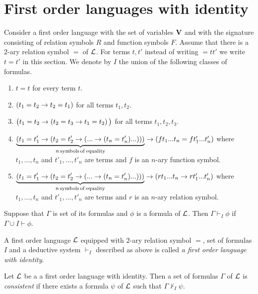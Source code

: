 \documentclass[10pt]{amsart}
\begin{document}
\section{First order languages with identity}
\noindent
Consider a first order language with the set of variables $\mathbf{V}$ and with the signature consisting of relation symbols $R$ and function symbols $F$. Assume that there is a $2$-ary relation symbol $=$ of ${\mathcal L}$. For terms $t,t'$ instead of writing $=tt'$ we write $t = t'$ in this section. We denote by $I$ the union of the following classes of formulas.
\begin{enumerate}[label=\textbf{(\arabic*)}, leftmargin=3.0em]
	\item $t = t$ for every term $t$.
	\item $(t_1 = t_2 \rightarrow t_2 = t_1)$ for all terms $t_1,t_2$.
	\item $\big(t_1 = t_2 \rightarrow \left(t_2 = t_3\rightarrow t_1 = t_2\right)\big)$ for all terms $t_1,t_2,t_3$.
	\item $\underbrace{\left(t_1 = t'_1 \rightarrow \left( t_2 = t'_2 \rightarrow \left(... \rightarrow (t_n = t'_n)...\right)\right)\right)}_{n\,\mathrm{symbols\,of\,equality}} \rightarrow \left(ft_1...t_n = ft'_1...t'_n\right)$ where $t_1,...,t_n$ and $t'_1,...,t'_n$ are terms and $f$ is an $n$-ary function symbol.
	\item $\underbrace{\left(t_1 = t'_1 \rightarrow \left( t_2 = t'_2 \rightarrow \left(... \rightarrow (t_n = t'_n)...\right)\right)\right)}_{n\,\mathrm{symbols\,of\,equality}} \rightarrow \left(rt_1...t_n \rightarrow rt'_1...t'_n\right)$ where $t_1,...,t_n$ and $t'_1,...,t'_n$ are terms and $r$ is an $n$-ary relation symbol.
\end{enumerate}

\begin{definition}
	Suppose that $\Gamma$ is set of its formulas and $\phi$ is a formula of ${\mathcal L}$. Then $\Gamma \vdash_I \phi$ if $\Gamma\cup I \vdash \phi$.
\end{definition}

\begin{definition}
	A first order language ${\mathcal L}$ equipped with $2$-ary relation symbol $=$, set of formulas $I$ and a deductive system $\vdash_I$ described as above is called \textit{a first order language with identity}.
\end{definition}

\begin{definition}
	Let ${\mathcal L}$ be a a first order language with identity. Then a set of formulas $\Gamma$ of ${\mathcal L}$ is \textit{consistent} if there exists a formula $\psi$ of ${\mathcal L}$ such that $\Gamma \nvdash_I \psi$.
\end{definition}
\end{document}
